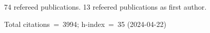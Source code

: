 74 refereed publications. 13 refeered publications as first author.

Total citations~=~3994; h-index~=~35 (2024-04-22)